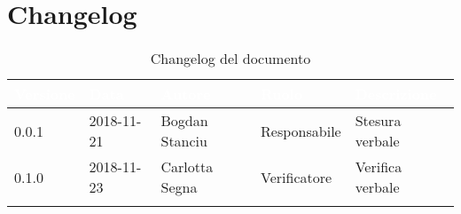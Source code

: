 \newpage

\section{Changelog}

\begin{center}
\begin{longtable}[c]{|m{}|m{}|m{}|m{}|p{}|}
\hline
\rowcolor{bluelogo}\textbf{\textcolor{white}{Versione}} & \textbf{\textcolor{white}{Data}} & \textbf{\textcolor{white}{Autore}} & \textbf{\textcolor{white}{Ruolo}} & \textbf{\textcolor{white}{Descrizione}}\\
\hline \hline
\endfirsthead
0.0.1 & 2018-11-21 & Bogdan Stanciu & Responsabile & Stesura verbale \\
\hline
\rowcolor{grigio} 0.1.0 & 2018-11-23 & Carlotta Segna & Verificatore & Verifica verbale\\
\hline
\caption{Changelog del documento}
\end{longtable}
\end{center}
